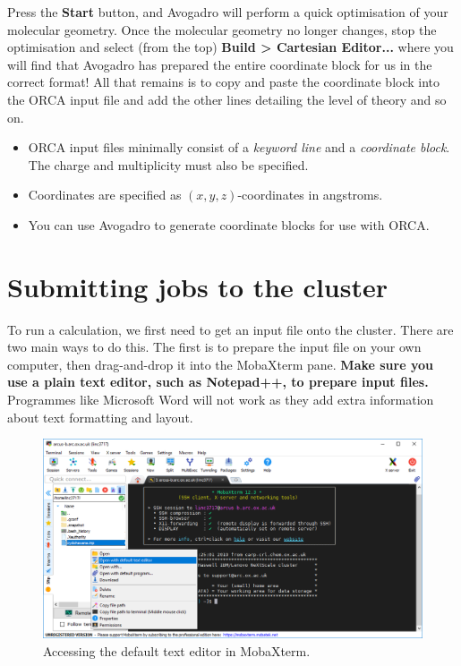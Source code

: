 \documentclass[10pt]{article}
\begin{document}
Press the \textbf{Start} button, and Avogadro will perform a quick optimisation of your molecular geometry. Once the molecular geometry no longer changes, stop the optimisation and select (from the top) \textbf{Build > Cartesian Editor...} where you will find that Avogadro has prepared the entire coordinate block for us in the correct format! All that remains is to copy and paste the coordinate block into the ORCA input file and add the other lines detailing the level of theory and so on.

\begin{summary}
    \begin{itemize}[leftmargin=0.6cm]
        \item ORCA input files minimally consist of a \textit{keyword line} and a \textit{coordinate block}. The charge and multiplicity must also be specified.
        \item Coordinates are specified as \((x, y, z)\)-coordinates in angstroms.
        \item You can use Avogadro to generate coordinate blocks for use with ORCA.
    \end{itemize}
\end{summary}


\section{Submitting jobs to the cluster}

To run a calculation, we first need to get an input file onto the cluster. There are two main ways to do this. The first is to prepare the input file on your own computer, then drag-and-drop it into the MobaXterm pane. \textbf{Make sure you use a plain text editor, such as Notepad++, to prepare input files.} Programmes like Microsoft Word will not work as they add extra information about text formatting and layout.

\begin{figure}[H]
    \centering
    \includegraphics[scale=0.4]{./img/texteditor}
    \caption{Accessing the default text editor in MobaXterm.}
    \label{fig:texteditor}
\end{figure}
\end{document}
